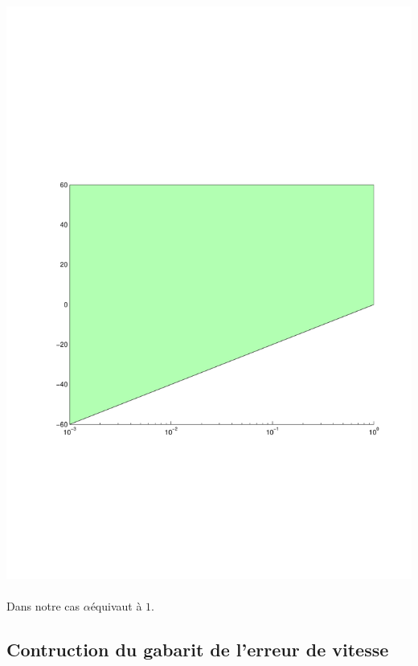 \documentclass[12pt, a4paper, openany]{report}
\begin{document}
   \begin{center}
    \includegraphics[scale=0.5]{gabarit1.pdf}
    \label{fig4}
  \end{center}

\paragraph{}
Dans notre cas $\alpha$\hspace {1mm}équivaut à \hspace{1mm} $1$.   
   
  \subsection{Contruction du gabarit de l'erreur de vitesse}
  
\end{document}
